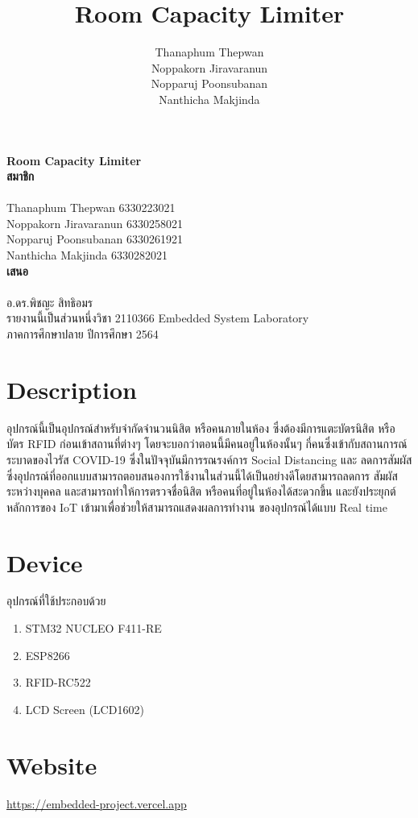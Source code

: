 \documentclass[fontsize=14pt]{extarticle}
\date{}
\title{\huge\textbf{Room Capacity Limiter}}
\author{Thanaphum Thepwan\\ Noppakorn Jiravaranun\\ Nopparuj Poonsubanan\\ Nanthicha Makjinda}
\begin{document}
\begin{center}
    \textbf{\Huge Room Capacity Limiter\\}
    \vspace*{\fill}
    {
        \LARGE
        \textbf{สมาชิก}\\~\\
        Thanaphum Thepwan 6330223021\\
        Noppakorn Jiravaranun 6330258021\\
        Nopparuj Poonsubanan 6330261921\\
        Nanthicha Makjinda 6330282021\\
        \vspace*{\fill}
        \textbf{เสนอ}\\~\\
        อ.ดร.พิชญะ สิทธิอมร\\
        \vspace*{\fill}
        รายงานนี้เป็นส่วนหนึ่งวิชา 2110366 Embedded System Laboratory\\
        ภาคการศึกษาปลาย ปีการศึกษา 2564
    }
\end{center}
\pagebreak
\tableofcontents
\pagebreak
\section{Description}
อุปกรณ์นี้เป็นอุปกรณ์สำหรับจำกัดจำนวนนิสิต หรือคนภายในห้อง ซึ่งต้องมีการแตะบัตรนิสิต หรือบัตร RFID ก่อนเข้าสถานที่ต่างๆ
โดยจะบอกว่าตอนนี้มีคนอยู่ในห้องนั้นๆ กี่คนซึ่งเข้ากับสถานการณ์ระบาดของไวรัส COVID-19
ซึ่งในปัจจุบันมีการรณรงค์การ Social Distancing และ ลดการสัมผัสซึ่งอุปกรณ์ที่ออกแบบสามารถตอบสนองการใช้งานในส่วนนี้ได้เป็นอย่างดีโดยสามารถลดการ
สัมผัสระหว่างบุคคล และสามารถทำให้การตรวจชื่อนิสิต หรือคนที่อยู่ในห้องได้สะดวกขึ้น และยังประยุกต์หลักการของ IoT
เข้ามาเพื่อช่วยให้สามารถแสดงผลการทํางาน ของอุปกรณ์ได้แบบ Real time
\section{Device}
อุปกรณ์ที่ใช้ประกอบด้วย\\
\begin{enumerate}
    \item STM32 NUCLEO F411-RE
    \item ESP8266
    \item RFID-RC522
    \item LCD Screen (LCD1602)
\end{enumerate}
\section{Website}
\url{https://embedded-project.vercel.app}
\end{document}
